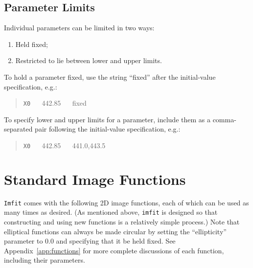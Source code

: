\documentclass[10pt]{article}
\newcommand{\imfit}{\texttt{imfit}}
\newcommand{\Imfit}{\texttt{Imfit}}
\begin{document}
\subsection{Parameter Limits}\label{sec:param-limits}

Individual parameters can be limited in two ways:
\begin{enumerate}
\item Held fixed;
\item Restricted to lie between lower and upper limits.
\end{enumerate}
To hold a parameter fixed, use the string ``fixed'' after the initial-value
specification, e.g.:
\begin{quote}
\texttt{X0} ~~ 442.85 ~~ fixed
\end{quote}
To specify lower and upper limits for a parameter, include them as a comma-separated
pair following the initial-value specification, e.g.:
\begin{quote}
\texttt{X0} ~~ 442.85 ~~ 441.0,443.5
\end{quote}



\section{Standard Image Functions}

\Imfit{} comes with the following 2D image functions, each of
which can be used as many times as desired. (As mentioned above, \imfit{}
is designed so that constructing and using new functions is a relatively
simple process.) Note that elliptical functions can always be made circular
by setting the ``ellipticity'' parameter to 0.0 and specifying that it be
held fixed. See Appendix~\ref{app:functions} for more complete discussions of each
function, including their parameters.
\end{document}

